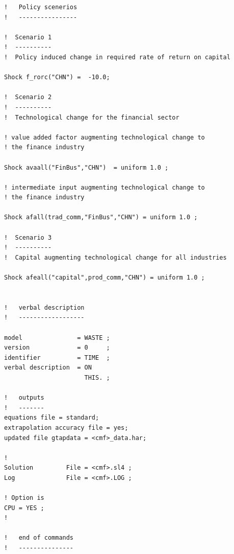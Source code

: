 \documentclass[AER]{AEA}
\begin{document}
\begin{multicols}{2}
\begin{verbatim}
!   Policy scenerios
!   ----------------

!  Scenario 1
!  ----------
!  Policy induced change in required rate of return on capital 

Shock f_rorc("CHN") =  -10.0;

!  Scenario 2
!  ----------
!  Technological change for the financial sector

! value added factor augmenting technological change to 
! the finance industry

Shock avaall("FinBus","CHN")  = uniform 1.0 ;   

! intermediate input augmenting technological change to 
! the finance industry

Shock afall(trad_comm,"FinBus","CHN") = uniform 1.0 ;       

!  Scenario 3
!  ----------
!  Capital augmenting technological change for all industries

Shock afeall("capital",prod_comm,"CHN") = uniform 1.0 ;  


!   verbal description
!   ------------------

model               = WASTE ;
version             = 0     ;
identifier          = TIME  ;
verbal description  = ON
                      THIS. ;

!   outputs
!   -------
equations file = standard;
extrapolation accuracy file = yes;
updated file gtapdata = <cmf>_data.har;

!
Solution         File = <cmf>.sl4 ;
Log              File = <cmf>.LOG ;

! Option is
CPU = YES ;
!

!   end of commands
!   ---------------
\end{verbatim}
\end{multicols}
\end{document}
